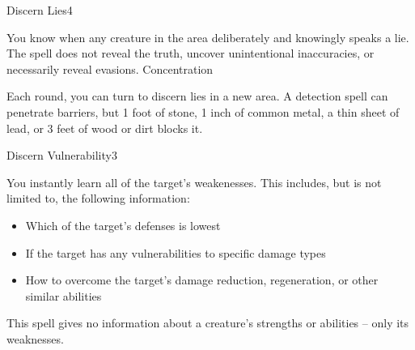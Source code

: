 \begin{spellsection}{Discern Lies}{4}
    \begin{spellheader}
    \end{spellheader}
    \begin{spellcontent}
        \begin{spelltargetinginfo}
        \end{spelltargetinginfo}
        \begin{spelleffects}
            \spelleffect You know when any creature in the area deliberately and knowingly speaks a lie. The spell does not reveal the truth, uncover unintentional inaccuracies, or necessarily reveal evasions.
            \spelldur Concentration
        \end{spelleffects}
    \end{spellcontent}
    \begin{spellfooter}
        \spellnotes Each round, you can turn to discern lies in a new area. A detection spell can penetrate barriers, but 1 foot of stone, 1 inch of common metal, a thin sheet of lead, or 3 feet of wood or dirt blocks it.
        \miscastexplode
    \end{spellfooter}
\end{spellsection}

\begin{spellsection}{Discern Vulnerability}{3}
    \begin{spellheader}
    \end{spellheader}
    \begin{spellcontent}
        \begin{spelltargetinginfo}
        \end{spelltargetinginfo}
        \begin{spelleffects}
            \spelleffect You instantly learn all of the target's weakenesses. This includes, but is not limited to, the following information:
            \begin{itemize}
                \item Which of the target's defenses is lowest
                \item If the target has any vulnerabilities to specific damage types
                \item How to overcome the target's damage reduction, regeneration, or other similar abilities
            \end{itemize}
            \spelldur \durshort
        \end{spelleffects}
    \end{spellcontent}
    \begin{spellfooter}
        \spellnotes This spell gives no information about a creature's strengths or abilities -- only its weaknesses.
        \miscastrandom
    \end{spellfooter}
\end{spellsection}

